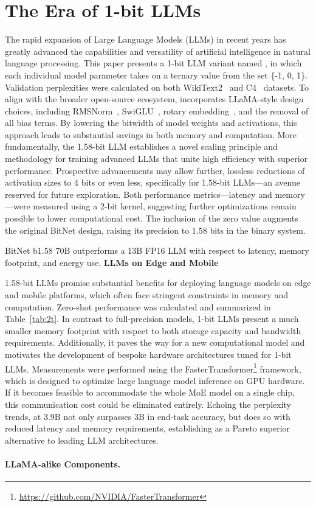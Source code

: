 \section{The Era of 1-bit LLMs}

The rapid expansion of Large Language Models (LLMs) in recent years has greatly advanced the capabilities and versatility of artificial intelligence in natural language processing. This paper presents a 1-bit LLM variant named \textbf{}, in which each individual model parameter takes on a ternary value from the set \{-1, 0, 1\}. Validation perplexities were calculated on both WikiText2~\cite{wikitext2} and C4~\cite{c4} datasets. To align with the broader open-source ecosystem,  incorporates LLaMA-style design choices, including RMSNorm~\cite{rmsnorm}, SwiGLU~\cite{swiglu}, rotary embedding~\cite{rope}, and the removal of all bias terms. By lowering the bitwidth of model weights and activations, this approach leads to substantial savings in both memory and computation. More fundamentally, the 1.58-bit LLM establishes a novel scaling principle and methodology for training advanced LLMs that unite high efficiency with superior performance. Prospective advancements may allow further, lossless reductions of activation sizes to 4 bits or even less, specifically for 1.58-bit LLMs—an avenue reserved for future exploration. Both performance metrics—latency and memory—were measured using a 2-bit kernel, suggesting further optimizations remain possible to lower computational cost. The inclusion of the zero value augments the original BitNet design, raising its precision to 1.58 bits in the binary system. \item BitNet b1.58 70B outperforms a 13B FP16 LLM with respect to latency, memory footprint, and energy use. \textbf{LLMs on Edge and Mobile}

1.58-bit LLMs promise substantial benefits for deploying language models on edge and mobile platforms, which often face stringent constraints in memory and computation. Zero-shot performance was calculated and summarized in Table~\ref{tab:2t}. In contrast to full-precision models, 1-bit LLMs present a much smaller memory footprint with respect to both storage capacity and bandwidth requirements. Additionally, it paves the way for a new computational model and motivates the development of bespoke hardware architectures tuned for 1-bit LLMs. Measurements were performed using the FasterTransformer\footnote{\url{https://github.com/NVIDIA/FasterTransformer}} framework, which is designed to optimize large language model inference on GPU hardware. If it becomes feasible to accommodate the whole MoE model on a single chip, this communication cost could be eliminated entirely. Echoing the perplexity trends,  at 3.9B not only surpasses  3B in end-task accuracy, but does so with reduced latency and memory requirements, establishing  as a Pareto superior alternative to leading LLM architectures. \paragraph{LLaMA-alike Components.}

